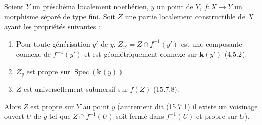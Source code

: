\begin{proposition}[15.7.9]
\label{IV.15.7.9-fr}
Soient $Y$ un préschéma localement noethérien, $y$ un point de $Y$, $f:X\to Y$ un morphisme séparé de type fini. Soit $Z$ une partie localement constructible de $X$ ayant les propriétés suivantes :
\begin{enumerate}
  \item[\rm (i)] Pour toute générisation $y'$ de $y$, $Z_{y'}=Z\cap f^{-1}(y')$ est une composante connexe de $f^{-1}(y')$ et est géométriquement connexe sur $\mathbf k(y')$ (4.5.2).
  \item[\rm (ii)] $Z_y$ est propre sur $\operatorname{Spec}(\mathbf k(y))$.
  \item[\rm (iii)] $Z$ est universellement submersif sur $f(Z)$ (15.7.8).
\end{enumerate}
Alors $Z$ est propre sur $Y$ au point $y$ (autrement dit (15.7.1) il existe un voisinage ouvert $U$ de $y$ tel que $Z\cap f^{-1}(U)$ soit fermé dans $f^{-1}(U)$ et propre sur $U$).
\end{proposition}

